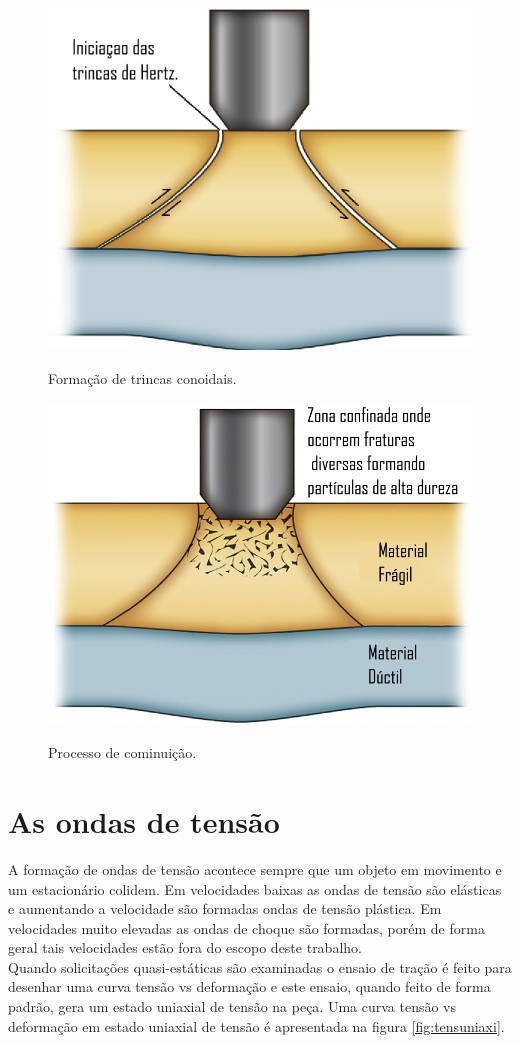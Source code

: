  \begin{figure}[H]
 	\centering
 	\caption{Formação de trincas conoidais.}
 	\includegraphics[width=0.5\linewidth]{images/hertz.png}
 	\label{fig:hertz}
 \end{figure}
 \begin{figure}[H]
 	\centering
 	\caption{Processo de cominuição.}
 	\includegraphics[width=0.5\linewidth]{images/comi.png}
 	\label{fig:cominuição}
 \end{figure}
 
 \section{As ondas de tensão}
 
 A formação de ondas de tensão acontece sempre que um objeto em movimento e um estacionário colidem. Em velocidades baixas as ondas de tensão são elásticas e aumentando a velocidade são formadas ondas de tensão plástica. Em velocidades muito  elevadas as ondas de choque são formadas, porém de forma geral tais velocidades estão fora do escopo deste trabalho.\\
 
 Quando solicitações quasi-estáticas são examinadas o ensaio de tração é feito para desenhar uma curva tensão vs deformação e este ensaio, quando feito de forma padrão, gera um estado uniaxial de tensão na peça. Uma curva tensão vs deformação em estado uniaxial de tensão é apresentada na figura \ref{fig:tensuniaxi}.
 
